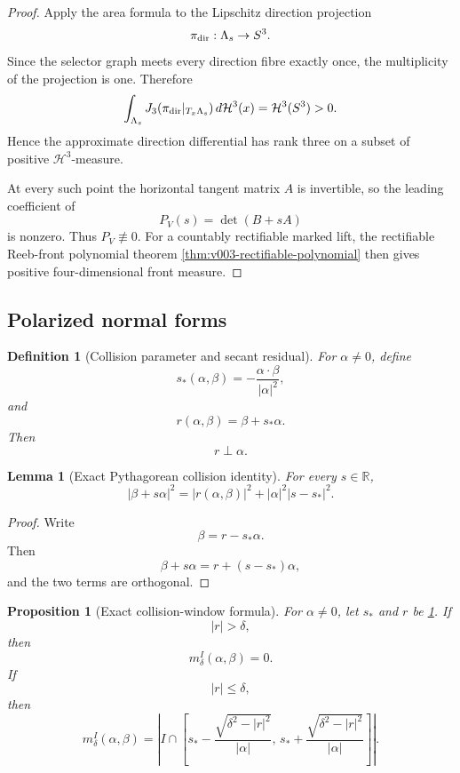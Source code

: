 \documentclass[10pt]{article}
\newtheorem{proposition}[theorem]{Proposition}
\newtheorem{lemma}[theorem]{Lemma}
\newtheorem{definition}[theorem]{Definition}
\newcommand{\R}{\mathbb R}
\begin{document}
\begin{proof}
Apply the area formula to the Lipschitz direction projection
\[
\pi_{\rm dir}:\Lambda_s\to S^3.
\]
Since the selector graph meets every direction fibre exactly once,
the multiplicity of the projection is one.  Therefore
\[
\int_{\Lambda_s}J_3(\pi_{\rm dir}|_{T_x\Lambda_s})\,d\mathcal H^3(x)
=
\mathcal H^3(S^3)>0.
\]
Hence the approximate direction differential has rank three on a subset of positive
\(\mathcal H^3\)-measure.

At every such point the horizontal tangent matrix \(A\) is invertible, so the leading coefficient
of
\[
P_V(s)=\det(B+sA)
\]
is nonzero.  Thus \(P_V\not\equiv0\).  For a countably rectifiable marked lift, the
rectifiable Reeb-front polynomial theorem
\cref{thm:v003-rectifiable-polynomial} then gives positive four-dimensional front measure.
\end{proof}

\subsection{Polarized normal forms}

\begin{definition}[Collision parameter and secant residual]
\label{def:v006-collision-residual}
For \(\alpha\ne0\), define
\begin{equation}
\label{eq:v006-sstar}
\boxed{
s_*(\alpha,\beta)
=
-\frac{\alpha\cdot\beta}{|\alpha|^2},
}
\end{equation}
and
\begin{equation}
\label{eq:v006-residual}
\boxed{
r(\alpha,\beta)
=
\beta+s_*\alpha.
}
\end{equation}
Then
\[
r\perp\alpha.
\]
\end{definition}

\begin{lemma}[Exact Pythagorean collision identity]
\label{lem:v006-pythagorean}
For every \(s\in\R\),
\begin{equation}
\label{eq:v006-pythagorean}
\boxed{
|\beta+s\alpha|^2
=
|r(\alpha,\beta)|^2
+
|\alpha|^2|s-s_*|^2.
}
\end{equation}
\end{lemma}

\begin{proof}
Write
\[
\beta=r-s_*\alpha.
\]
Then
\[
\beta+s\alpha=r+(s-s_*)\alpha,
\]
and the two terms are orthogonal.
\end{proof}

\begin{proposition}[Exact collision-window formula]
\label{prop:v006-window-formula}
For \(\alpha\ne0\), let \(s_*\) and \(r\) be
\cref{def:v006-collision-residual}.  If
\[
|r|>\delta,
\]
then
\[
m_\delta^I(\alpha,\beta)=0.
\]
If
\[
|r|\le\delta,
\]
then
\begin{equation}
\label{eq:v006-window-formula}
\boxed{
m_\delta^I(\alpha,\beta)
=
\left|
I\cap
\left[
s_*-\frac{\sqrt{\delta^2-|r|^2}}{|\alpha|},
\,
s_*+\frac{\sqrt{\delta^2-|r|^2}}{|\alpha|}
\right]
\right|.
}
\end{equation}
\end{proposition}
\end{document}
